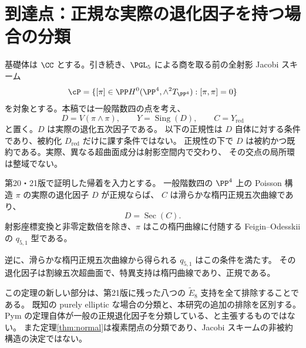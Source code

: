\section{到達点：正規な実際の退化因子を持つ場合の分類}

基礎体は $\CC$ とする。引き続き、$\PGL_5$ による商を取る前の全射影 Jacobi スキーム
\[
 \cP=\{[\pi]\in\PP H^0(\PP^4,\wedge^2T_{\PP^4}):[\pi,\pi]=0\}
\]
を対象とする。本稿では一般階数四の点を考え、
\[
 D=V(\pi\wedge\pi),\qquad Y=\operatorname{Sing}(D),\qquad C=Y_{\mathrm{red}}
\]
と置く。$D$ は実際の退化五次因子である。
以下の正規性は $D$ 自体に対する条件であり、被約化 $D_{\mathrm{red}}$ だけに課す条件ではない。
正規性の下で $D$ は被約かつ既約である。実際、異なる超曲面成分は射影空間内で交わり、
その交点の局所環は整域でない。

\begin{theorem}\label{thm:normal}
第20・21版で証明した帰着を入力とする。
一般階数四の $\PP^4$ 上の Poisson 構造 $\pi$ の実際の退化因子 $D$ が正規ならば、
$C$ は滑らかな楕円正規五次曲線であり、
\[
 D=\operatorname{Sec}(C).
\]
射影座標変換と非零定数倍を除き、$\pi$ はこの楕円曲線に付随する
Feigin--Odesskii の $q_{5,1}$ 型である。
\end{theorem}
逆に、滑らかな楕円正規五次曲線から得られる $q_{5,1}$ はこの条件を満たす。
その退化因子は割線五次超曲面で、特異支持は楕円曲線であり、正規である\cite{Pym}。

この定理の新しい部分は、第21版に残った八つの $\widetilde E_8$ 支持を全て排除することである。
既知の purely elliptic な場合の分類\cite{Pym}と、本研究の追加の排除を区別する。
Pym の定理自体が一般の正規退化因子を分類している、と主張するものではない。
また定理\ref{thm:normal}は複素閉点の分類であり、Jacobi スキームの非被約構造の決定ではない。

